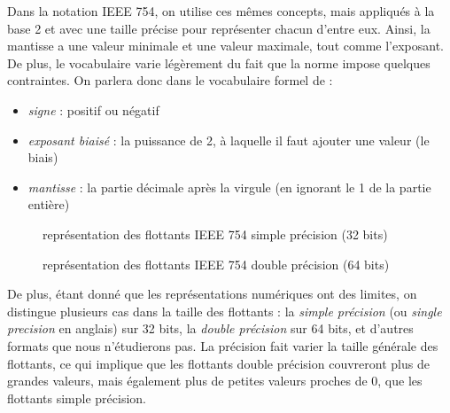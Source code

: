\documentclass[11pt,a4paper]{article}
\begin{document}
\bigskip

Dans la notation IEEE 754, on utilise ces mêmes concepts, mais appliqués à la base 2 et avec une taille précise pour représenter chacun d'entre eux.
Ainsi, la mantisse a une valeur minimale et une valeur maximale, tout comme l'exposant.
De plus, le vocabulaire varie légèrement du fait que la norme impose quelques contraintes.
On parlera donc dans le vocabulaire formel de :

\bigskip

\begin{itemize}
\item \textit{signe} : positif ou négatif
\item \textit{exposant biaisé} : la puissance de 2, à laquelle il faut ajouter une valeur (le biais)
\item \textit{mantisse} : la partie décimale après la virgule (en ignorant le 1 de la partie entière)
\end{itemize}

\begin{figure}[ht!]
\caption{représentation des flottants IEEE 754 simple précision (32 bits)}
\end{figure}

\begin{figure}[ht!]
\caption{représentation des flottants IEEE 754 double précision (64 bits)}
\end{figure}


\bigskip

De plus, étant donné que les représentations numériques ont des limites, on distingue plusieurs cas dans la taille des flottants : la \textit{simple précision} (ou \textit{single precision} en anglais) sur 32 bits, la \textit{double précision} sur 64 bits, et d'autres formats que nous n'étudierons pas.
La précision fait varier la taille générale des flottants, ce qui implique que les flottants double précision couvreront plus de grandes valeurs, mais également plus de petites valeurs proches de $ 0 $, que les flottants simple précision.
\end{document}

